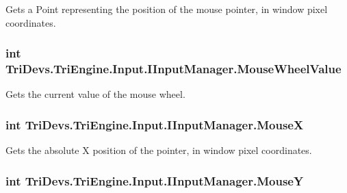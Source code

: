 Gets a Point representing the position of the mouse pointer, in window pixel coordinates. 

\hypertarget{interface_tri_devs_1_1_tri_engine_1_1_input_1_1_i_input_manager_a43026ac0472d9e93ed7a9af4678c7ef0}{
\subsubsection[{Mouse\-Wheel\-Value}]{\setlength{\rightskip}{0pt plus 5cm}int Tri\-Devs.\-Tri\-Engine.\-Input.\-I\-Input\-Manager.\-Mouse\-Wheel\-Value\hspace{0.3cm}{\ttfamily [get]}}}\label{interface_tri_devs_1_1_tri_engine_1_1_input_1_1_i_input_manager_a43026ac0472d9e93ed7a9af4678c7ef0}


Gets the current value of the mouse wheel. 

\hypertarget{interface_tri_devs_1_1_tri_engine_1_1_input_1_1_i_input_manager_a83c16b8ea4d95464abaafb187ce6dd48}{
\subsubsection[{Mouse\-X}]{\setlength{\rightskip}{0pt plus 5cm}int Tri\-Devs.\-Tri\-Engine.\-Input.\-I\-Input\-Manager.\-Mouse\-X\hspace{0.3cm}{\ttfamily [get]}}}\label{interface_tri_devs_1_1_tri_engine_1_1_input_1_1_i_input_manager_a83c16b8ea4d95464abaafb187ce6dd48}


Gets the absolute X position of the pointer, in window pixel coordinates. 

\hypertarget{interface_tri_devs_1_1_tri_engine_1_1_input_1_1_i_input_manager_abf34e14e3a3e440cbed57d231646113a}{
\subsubsection[{Mouse\-Y}]{\setlength{\rightskip}{0pt plus 5cm}int Tri\-Devs.\-Tri\-Engine.\-Input.\-I\-Input\-Manager.\-Mouse\-Y\hspace{0.3cm}{\ttfamily [get]}}}\label{interface_tri_devs_1_1_tri_engine_1_1_input_1_1_i_input_manager_abf34e14e3a3e440cbed57d231646113a}


